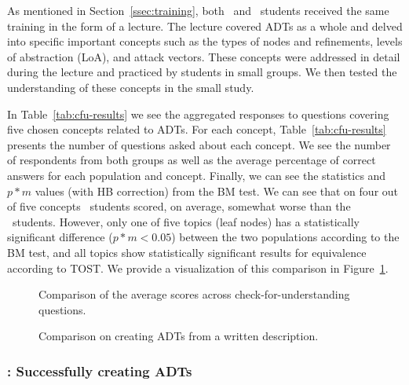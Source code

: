 As mentioned in Section~\ref{ssec:training}, both \ICS\ and \SEC\ students received the same training in the form of a lecture. The lecture covered ADTs as a whole and delved into specific important concepts such as the types of nodes and refinements, levels of abstraction (LoA), and attack vectors. These concepts were addressed in detail during the lecture and practiced by students in small groups. We then tested the understanding of these concepts in the small study. 

In Table~\ref{tab:cfu-results} we see the aggregated responses to questions covering five chosen concepts related to ADTs. For each concept, Table~\ref{tab:cfu-results} presents the number of questions asked about each concept. We see the number of respondents from both groups as well as the average percentage of correct answers for each population and concept. Finally, we can see the statistics and $p * m$ values (with HB correction)  from the BM test. We can see that on four out of five concepts \ICS\ students scored, on average, somewhat worse than the \SEC\ students. However, only one of five topics (leaf nodes) has a statistically significant difference ($p * m <0.05$) between the two populations according to the BM test, and all topics show statistically significant results for equivalence according to TOST. We provide a visualization of this comparison in Figure~\ref{img:cfu}.




\begin{figure}[h]
    \caption{Comparison of the average scores across check-for-understanding questions.}
    \label{img:cfu}
\end{figure}




\begin{figure}[t]
    \caption{Comparison on creating ADTs from a written description.}
    \label{fig:adt2-comparison}
\end{figure}




\subsubsection{\hypothesis{\hypoSecondADT}: Successfully creating ADTs}\label{ssec:results-h2}


